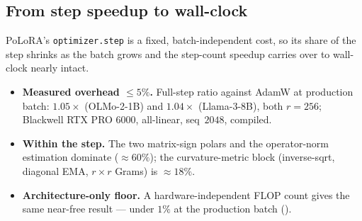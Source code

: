 \documentclass[11pt]{article}
\newcommand{\methodname}{PoLoRA\xspace}
\theoremstyle{plain}
\theoremstyle{definition}
\theoremstyle{remark}
\begin{document}
\subsection{From step speedup to wall-clock}
\label{sec:exp-walltime}
\methodname{}'s \texttt{optimizer.step} is a fixed, batch-independent cost, so its share
of the step shrinks as the batch grows and the step-count speedup carries over to
wall-clock nearly intact.
\begin{itemize}[leftmargin=1.5em,itemsep=1pt,topsep=2pt]
  \item \textbf{Measured overhead ${\le}5\%$.} Full-step ratio against AdamW at production batch: $1.05\times$ (OLMo-2-1B) and $1.04\times$ (Llama-3-8B), both $r{=}256$; Blackwell RTX PRO 6000, all-linear, seq~$2048$, compiled.
  \item \textbf{Within the step.} The two matrix-sign polars and the operator-norm estimation dominate (${\approx}60\%$); the curvature-metric block (inverse-sqrt, diagonal EMA, $r{\times}r$ Grams) is ${\approx}18\%$.
  \item \textbf{Architecture-only floor.} A hardware-independent FLOP count gives the same near-free result --- under $1\%$ at the production batch ().
\end{itemize}
\end{document}
